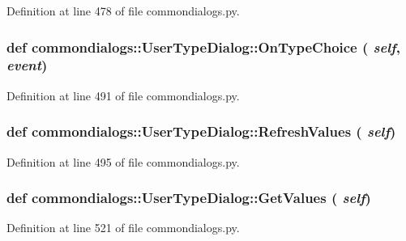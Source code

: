 Definition at line 478 of file commondialogs.py.\hypertarget{classcommondialogs_1_1UserTypeDialog_3e986bfc827c25d7786f4d4262ee329b}{
\subsubsection[OnTypeChoice]{\setlength{\rightskip}{0pt plus 5cm}def commondialogs::User\-Type\-Dialog::On\-Type\-Choice ( {\em self},  {\em event})}}
\label{classcommondialogs_1_1UserTypeDialog_3e986bfc827c25d7786f4d4262ee329b}




Definition at line 491 of file commondialogs.py.\hypertarget{classcommondialogs_1_1UserTypeDialog_28ae4b33e1b5f98fcc80f57f421bdf67}{
\subsubsection[RefreshValues]{\setlength{\rightskip}{0pt plus 5cm}def commondialogs::User\-Type\-Dialog::Refresh\-Values ( {\em self})}}
\label{classcommondialogs_1_1UserTypeDialog_28ae4b33e1b5f98fcc80f57f421bdf67}




Definition at line 495 of file commondialogs.py.\hypertarget{classcommondialogs_1_1UserTypeDialog_fb21ee3e7916e8de7756b0e87cc70e90}{
\subsubsection[GetValues]{\setlength{\rightskip}{0pt plus 5cm}def commondialogs::User\-Type\-Dialog::Get\-Values ( {\em self})}}
\label{classcommondialogs_1_1UserTypeDialog_fb21ee3e7916e8de7756b0e87cc70e90}




Definition at line 521 of file commondialogs.py.

